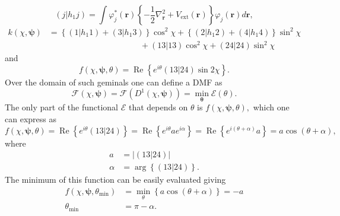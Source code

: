 \documentclass[aps,preprint]{revtex4}%
\begin{document}
\begin{equation}
\left(  j\left\vert h_{1}j\right.  \right)  =\int\varphi_{j}^{\ast}\left(
\boldsymbol{r}\right)  \left\{  -\frac{1}{2}\nabla_{\boldsymbol{r}}%
^{2}+V_{\text{ext}}\left(  \boldsymbol{r}\right)  \right\}  \varphi_{j}\left(
\boldsymbol{r}\right)  d\boldsymbol{r},
\end{equation}%
\begin{align}
k\left(  \chi,\boldsymbol{\psi}\right)   &  =\left\{  \left(  1\left\vert
h_{1}1\right.  \right)  +\left(  3\left\vert h_{1}3\right.  \right)  \right\}
\cos^{2}\chi+\left\{  \left(  2\left\vert h_{1}2\right.  \right)  +\left(
4\left\vert h_{1}4\right.  \right)  \right\}  \sin^{2}\chi\nonumber\\
&  \qquad\qquad\qquad\qquad\qquad\quad+\left(  \left.  13\right\vert
13\right)  \cos^{2}\chi+\left(  \left.  24\right\vert 24\right)  \sin^{2}\chi
\end{align}
and
\begin{equation}
f\left(  \chi,\boldsymbol{\psi},\theta\right)  =\operatorname{Re}\left\{
e^{i\theta}\left(  \left.  13\right\vert 24\right)  \sin2\chi\right\}  .
\end{equation}
Over the domain of such geminals one can define a DMF as
\begin{equation}
\mathcal{F}\left(  \chi,\boldsymbol{\psi}\right)  =\mathcal{F}\left(
D^{1}\left(  \chi,\boldsymbol{\psi}\right)  \right)  =\min_{\boldsymbol{\theta
}}\mathcal{E}\left(  \theta\right)  .
\end{equation}
The only part of the functional $\mathcal{E}$ that depends on $\theta$ is
$f\left(  \chi,\boldsymbol{\psi},\theta\right)  ,$ which one can express as
\begin{equation}
f\left(  \chi,\boldsymbol{\psi},\theta\right)  =\operatorname{Re}\left\{
e^{i\theta}\left(  \left.  13\right\vert 24\right)  \right\}
=\operatorname{Re}\left\{  e^{i\theta}ae^{i\alpha}\right\}  =\operatorname{Re}%
\left\{  e^{i\left(  \theta+\alpha\right)  }a\right\}  =a\cos\left(
\theta+\alpha\right)  ,
\end{equation}
where
\begin{align}
a  &  =\left\vert \left(  \left.  13\right\vert 24\right)  \right\vert \\
\alpha &  =\arg\left\{  \left(  \left.  13\right\vert 24\right)  \right\}  .
\end{align}
The minimum of this function can be easily evaluated giving
\begin{align}
f\left(  \chi,\boldsymbol{\psi},\theta_{\min}\right)   &  =\min_{\theta
}\left\{  a\cos\left(  \theta+\alpha\right)  \right\}  =-a\\
\theta_{\min}  &  =\pi-\alpha.
\end{align}
\end{document}
